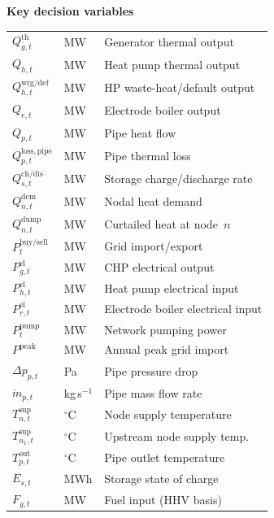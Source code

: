 \documentclass[a4paper,fleqn]{cas-dc}
\begin{document}
{\smallskip\noindent\textbf{Key decision variables}\par\nopagebreak\smallskip
\noindent
\begin{tabular}{@{} >{\raggedright}p{1.8cm} >{\raggedright}p{1.2cm} p{3.5cm} @{}}
$Q_{g,t}^{\mathrm{th}}$       & MW       & Generator thermal output \\
$Q_{h,t}$                     & MW       & Heat pump thermal output \\
$Q_{h,t}^{\mathrm{wrg/def}}$  & MW       & HP waste-heat/default output \\
$Q_{r,t}$                     & MW       & Electrode boiler output \\
$Q_{p,t}$                     & MW       & Pipe heat flow \\
$Q_{p,t}^{\mathrm{loss,pipe}}$& MW       & Pipe thermal loss \\
$Q_{s,t}^{\mathrm{ch/dis}}$   & MW       & Storage charge/discharge rate \\
$Q_{n,t}^{\mathrm{dem}}$      & MW       & Nodal heat demand \\
$Q_{n,t}^{\mathrm{dump}}$     & MW       & Curtailed heat at node~$n$ \\
$P_t^{\mathrm{buy/sell}}$     & MW       & Grid import/export \\
$P_{g,t}^{\mathrm{el}}$       & MW       & CHP electrical output \\
$P_{h,t}^{\mathrm{el}}$       & MW       & Heat pump electrical input \\
$P_{r,t}^{\mathrm{el}}$       & MW       & Electrode boiler electrical input \\
$P_t^{\mathrm{pump}}$         & MW       & Network pumping power \\
$P^{\mathrm{peak}}$           & MW       & Annual peak grid import \\
$\Delta p_{p,t}$              & Pa       & Pipe pressure drop \\
$\dot{m}_{p,t}$               & kg\,s$^{-1}$ & Pipe mass flow rate \\
$T_{n,t}^{\mathrm{sup}}$      & $^\circ$C & Node supply temperature \\
$T_{n_1,t}^{\mathrm{sup}}$    & $^\circ$C & Upstream node supply temp. \\
$T_{p,t}^{\mathrm{out}}$      & $^\circ$C & Pipe outlet temperature \\
$E_{s,t}$                     & MWh      & Storage state of charge \\
$F_{g,t}$                     & MW       & Fuel input (HHV basis) \\

\end{tabular}}
\end{document}
